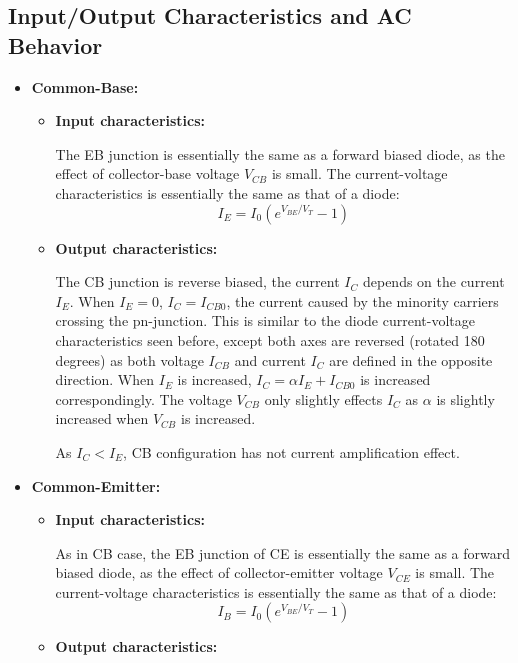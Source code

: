 \subsection*{Input/Output Characteristics and AC Behavior} 

\begin{itemize}
\item {\bf Common-Base:}

\begin{itemize}
\item {\bf Input characteristics:} 

The EB junction is essentially the same as a forward biased diode, as the 
effect of collector-base voltage $V_{CB}$ is small. The current-voltage 
characteristics is essentially the same as that of a diode:
\[ I_E=I_0 ( e^{V_{BE}/V_T}-1 )	\]

\item {\bf Output characteristics:} 

The CB junction is reverse biased, the current $I_C$ depends on the current
$I_E$. When $I_E=0$, $I_C=I_{CB0}$, the current caused by the minority 
carriers crossing the pn-junction. This is similar to the diode current-voltage 
characteristics seen before, except both axes are reversed (rotated 180 
degrees) as both voltage $I_{CB}$ and current $I_C$ are defined in the 
opposite direction. When $I_E$ is increased, $I_C=\alpha I_E+I_{CB0}$ is 
increased correspondingly. The voltage $V_{CB}$ only slightly effects $I_C$ 
as $\alpha$ is slightly increased when $V_{CB}$ is increased.

As $I_C<I_E$, CB configuration has not current amplification effect.


\end{itemize}

\item {\bf Common-Emitter:}

\begin{itemize}
\item {\bf Input characteristics:} 

As in CB case, the EB junction of CE is essentially the same as a forward
biased diode, as the effect of collector-emitter voltage $V_{CE}$ is small. 
The current-voltage characteristics is essentially the same as that of a diode:
\[ I_B=I_0 ( e^{V_{BE}/V_T}-1 )	\]

\item {\bf Output characteristics:} 


\end{itemize}
\end{itemize}
